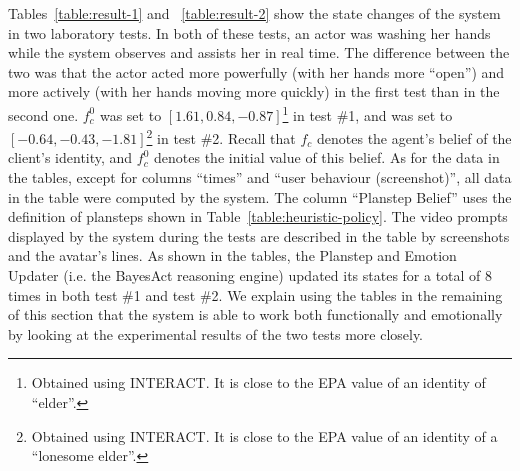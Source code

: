 Tables~\ref{table:result-1} and ~\ref{table:result-2} show the state changes of the system in two laboratory tests. In both of these tests, an actor was washing her hands while the system observes and assists her in real time. The difference between the two was that the actor acted more powerfully (with her hands more ``open'') and more actively (with her hands moving more quickly) in the first test than in the second one. $f_c^0$ was set to $[1.61, 0.84, -0.87]$\footnote{Obtained using INTERACT. It is close to the EPA value of an identity of ``elder''.} in test \#1, and was set to $[-0.64, -0.43, -1.81]$\footnote{Obtained using INTERACT. It is close to the EPA value of an identity of a ``lonesome elder''.} in test \#2. Recall that $f_c$ denotes the agent's belief of the client's identity, and $f_c^0$ denotes the initial value of this belief. As for the data in the tables, except for columns ``times'' and ``user behaviour (screenshot)'', all data in the table were computed by the system. The column ``Planstep Belief'' uses the definition of plansteps shown in Table~\ref{table:heuristic-policy}. The video prompts displayed by the system during the tests are described in the table by screenshots and the avatar's lines. As shown in the tables, the Planstep and Emotion Updater (i.e. the BayesAct reasoning engine) updated its states for a total of 8 times in both test \#1 and test \#2. We explain using the tables in the remaining of this section that the system is able to work both functionally and emotionally by looking at the experimental results of the two tests more closely.

%

